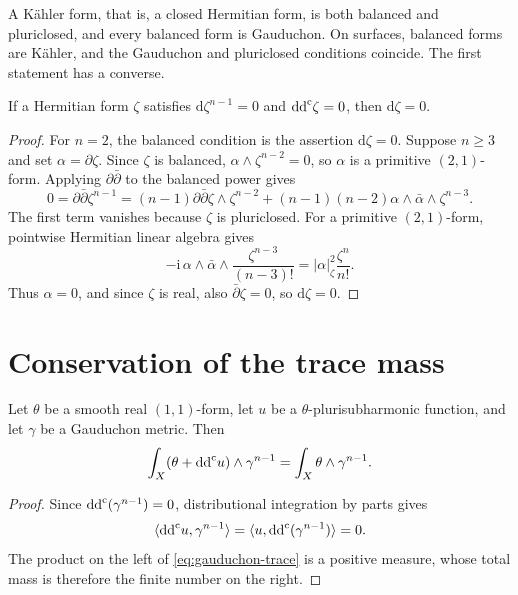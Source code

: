 A K\"ahler form, that is, a closed Hermitian form, is both balanced and pluriclosed, and every balanced form is Gauduchon. On surfaces, balanced forms are K\"ahler, and the Gauduchon and pluriclosed conditions coincide. The first statement has a converse.

\begin{lemma}\label{lem:balanced-pluriclosed-closed}
If a Hermitian form $\zeta$ satisfies $\mathrm d\zeta^{n-1}=0$ and $\mathrm{dd}^{\mathrm{c}}\zeta=0$, then $\mathrm d\zeta=0$.
\end{lemma}
\begin{proof}
For $n=2$, the balanced condition is the assertion $\mathrm d\zeta=0$. Suppose $n\geq3$ and set $\alpha=\partial\zeta$. Since $\zeta$ is balanced, $\alpha\wedge\zeta^{n-2}=0$, so $\alpha$ is a primitive $(2,1)$-form. Applying $\partial\bar\partial$ to the balanced power gives
\[
 0=\partial\bar\partial\zeta^{n-1}
  =(n-1)\partial\bar\partial\zeta\wedge\zeta^{n-2}
    +(n-1)(n-2)\alpha\wedge\bar\alpha\wedge\zeta^{n-3}.
\]
The first term vanishes because $\zeta$ is pluriclosed. For a primitive $(2,1)$-form, pointwise Hermitian linear algebra gives
\[
 -\mathrm i\,\alpha\wedge\bar\alpha\wedge
                 \frac{\zeta^{n-3}}{(n-3)!}
       =|\alpha|_\zeta^2\frac{\zeta^n}{n!}.
\]
Thus $\alpha=0$, and since $\zeta$ is real, also $\bar\partial\zeta=0$, so $\mathrm d\zeta=0$.
\end{proof}

\section{Conservation of the trace mass}

\begin{proposition}\label{prop:gauduchon-trace}
Let $\theta$ be a smooth real $(1,1)$-form, let $u$ be a $\theta$-plurisubharmonic function, and let $\gamma$ be a Gauduchon metric. Then
\begin{equation}\label{eq:gauduchon-trace}
 \int_X(\theta+\mathrm{dd}^{\mathrm{c}} u)\wedge\gamma^{n-1}
 =\int_X\theta\wedge\gamma^{n-1}.
\end{equation}
\end{proposition}
\begin{proof}
Since $\mathrm{dd}^{\mathrm{c}}(\gamma^{n-1})=0$, distributional integration by parts gives
\[
 \langle\mathrm{dd}^{\mathrm{c}} u,\gamma^{n-1}\rangle
 =\langle u,\mathrm{dd}^{\mathrm{c}}(\gamma^{n-1})\rangle=0.
\]
The product on the left of \eqref{eq:gauduchon-trace} is a positive measure, whose total mass is therefore the finite number on the right.
\end{proof}

